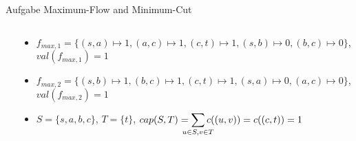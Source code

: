 \begin{frame}[allowframebreaks]{Aufgabe \thesection}{Maximum-Flow and Minimum-Cut}
\begin{solution}
\begin{columns}
\begin{column}{0.5\textwidth}
      \end{column}
    \end{columns}
  \end{solution}
  \begin{solution}
    \begin{columns}
      \begin{column}{0.4\textwidth}
      \end{column}
      \begin{column}{0.6\textwidth}
        \begin{itemize}
          \item $f_{max, 1} = \{(s, a)\mapsto 1, (a, c)\mapsto 1, (c, t)\mapsto 1, (s, b)\mapsto 0, (b, c)\mapsto 0\}$, $val(f_{max, 1}) = 1$
          \item $f_{max, 2} = \{(s, b)\mapsto 1, (b, c)\mapsto 1, (c, t)\mapsto 1, (s, a)\mapsto 0, (a, c)\mapsto 0\}$, $val(f_{max, 2}) = 1$
          \item $S = \{s, a, b, c\}$, $T = \{t\}$, $\displaystyle cap(S, T)=\sum_{\mathclap{\substack{u\in S, v\in T}}} c((u, v)) = c((c, t)) = 1$
        \end{itemize}
      \end{column}
    \end{columns}
  \end{solution}
  \begin{solution}
    \begin{columns}
      \begin{column}{0.5\textwidth}
      \end{column}
      \begin{column}{0.5\textwidth}
      \end{column}
    \end{columns}
  \end{solution}
  \begin{solution}
    \begin{columns}
      \begin{column}{0.5\textwidth}
      \end{column}
      \begin{column}{0.5\textwidth}
      \end{column}
    \end{columns}

\end{solution}
\end{frame}
